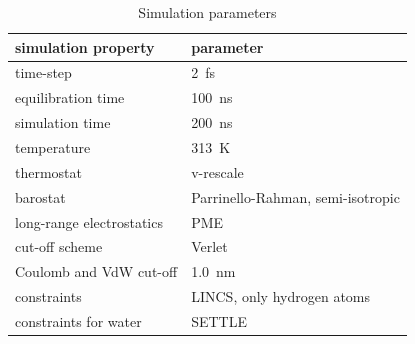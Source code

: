 \documentclass[aip,jcp,twocolumn]{revtex4}
\begin{document}
\begin{table}[btp]
  \caption{Simulation parameters}
  \label{tbl:mdpar}
  \begin{tabular}{ll}
    simulation property & parameter   \\
    \hline
    time-step           & 2~fs         \\
    equilibration time  & 100~ns  \\
    simulation time     & 200~ns  \\
    temperature         & 313~K       \\
    thermostat          & v-rescale  \cite{bussi07}   \\
    barostat            & Parrinello-Rahman, semi-isotropic \cite{parrinello81} \\
    long-range electrostatics & PME  \cite{darden93}  \\
    cut-off scheme      & Verlet \cite{Pall13}      \\
    Coulomb and VdW cut-off & 1.0~nm \\
    constraints         & LINCS, only hydrogen atoms \cite{hess97} \\
    constraints for water & SETTLE  \cite{miyamoto92} \\
    \hline
  \end{tabular}
\end{table}
\end{document}
